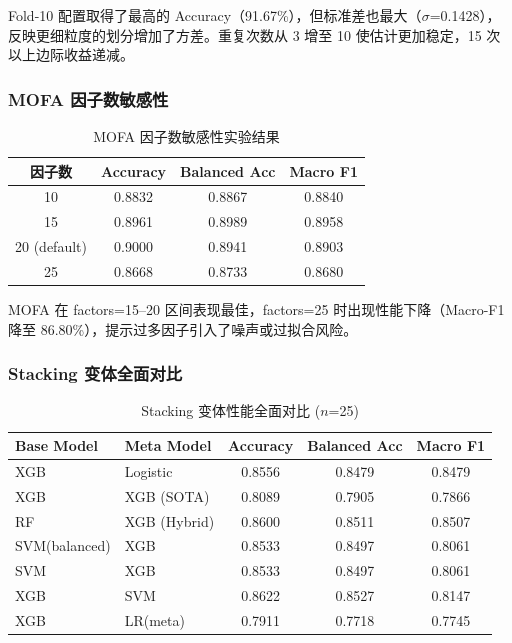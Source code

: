 Fold-10 配置取得了最高的 Accuracy（91.67\%），但标准差也最大（$\sigma$=0.1428），反映更细粒度的划分增加了方差。重复次数从 3 增至 10 使估计更加稳定，15 次以上边际收益递减。

\subsubsection{MOFA 因子数敏感性}

\begin{table}[H]
\centering
\caption{MOFA 因子数敏感性实验结果}
\label{tab:mofa-sensitivity}
\begin{tabular}{cccc}
\toprule
因子数 & Accuracy & Balanced Acc & Macro F1 \\
\midrule
10 & 0.8832 & 0.8867 & 0.8840 \\
15 & 0.8961 & 0.8989 & 0.8958 \\
20 (default) & 0.9000 & 0.8941 & 0.8903 \\
25 & 0.8668 & 0.8733 & 0.8680 \\
\bottomrule
\end{tabular}
\end{table}

MOFA 在 factors=15--20 区间表现最佳，factors=25 时出现性能下降（Macro-F1 降至 86.80\%），提示过多因子引入了噪声或过拟合风险。

\subsubsection{Stacking 变体全面对比}

\begin{table}[H]
\centering
\caption{Stacking 变体性能全面对比 ($n$=25)}
\label{tab:stacking-all}
\begin{tabular}{llccc}
\toprule
Base Model & Meta Model & Accuracy & Balanced Acc & Macro F1 \\
\midrule
XGB & Logistic & 0.8556 & 0.8479 & 0.8479 \\
XGB & XGB (SOTA) & 0.8089 & 0.7905 & 0.7866 \\
RF & XGB (Hybrid) & 0.8600 & 0.8511 & 0.8507 \\
SVM(balanced) & XGB & 0.8533 & 0.8497 & 0.8061 \\
SVM & XGB & 0.8533 & 0.8497 & 0.8061 \\
XGB & SVM & 0.8622 & 0.8527 & 0.8147 \\
XGB & LR(meta) & 0.7911 & 0.7718 & 0.7745 \\
\bottomrule
\end{tabular}
\end{table}

